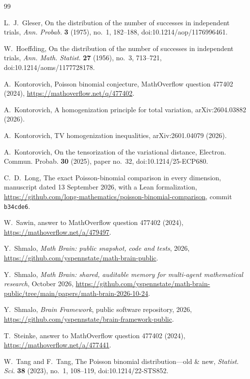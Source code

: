 \documentclass[11pt,a4paper]{article}
\numberwithin{equation}{section}
\theoremstyle{remark}
\begin{document}
\begin{thebibliography}{99}

 L.~J.~Gleser, On the distribution of the number of successes in independent trials, \emph{Ann. Probab.} \textbf{3} (1975), no.~1, 182--188, doi:10.1214/aop/1176996461.

 W.~Hoeffding, On the distribution of the number of successes in independent trials, \emph{Ann. Math. Statist.} \textbf{27} (1956), no.~3, 713--721, doi:10.1214/aoms/1177728178.

 A.~Kontorovich, Poisson binomial conjecture, MathOverflow question 477402 (2024), \url{https://mathoverflow.net/q/477402}.

 A.~Kontorovich, A homogenization principle for total variation, arXiv:2604.03882 (2026).

 A.~Kontorovich, TV homogenization inequalities, arXiv:2601.04079 (2026).

 A.~Kontorovich, On the tensorization of the variational distance, Electron. Commun. Probab. \textbf{30} (2025), paper no.~32, doi:10.1214/25-ECP680.

 C.~D.~Long, The exact Poisson-binomial comparison in every dimension, manuscript dated 13 September 2026, with a Lean formalization, \url{https://github.com/long-mathematics/poisson-binomial-comparison}, commit \texttt{b34cde6}.

 W.~Sawin, answer to MathOverflow question 477402 (2024), \url{https://mathoverflow.net/a/479497}.

 Y.~Shmalo, \emph{Math Brain: public snapshot, code and tests}, 2026, \url{https://github.com/yspennstate/math-brain-public}.

 Y.~Shmalo, \emph{Math Brain: shared, auditable memory for multi-agent mathematical research}, October 2026, \url{https://github.com/yspennstate/math-brain-public/tree/main/papers/math-brain-2026-10-24}.

 Y.~Shmalo, \emph{Brain Framework}, public software repository, 2026, \url{https://github.com/yspennstate/brain-framework-public}.

 T.~Steinke, answer to MathOverflow question 477402 (2024), \url{https://mathoverflow.net/a/477441}.

 W.~Tang and F.~Tang, The Poisson binomial distribution---old \& new, \emph{Statist. Sci.} \textbf{38} (2023), no.~1, 108--119, doi:10.1214/22-STS852.

\end{thebibliography}
\end{document}
